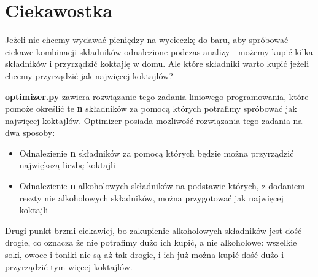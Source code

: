 \documentclass{article}
\begin{document}
\clearpage

\section{Ciekawostka}
Jeżeli nie chcemy wydawać pieniędzy na wycieczkę do baru, aby spróbować ciekawe kombinacji składników odnalezione podczas analizy - możemy kupić kilka składników i przyrządzić koktajlę w domu. Ale które składniki warto kupić jeżeli chcemy przyrządzić jak najwięcej koktajlów?

\textbf{optimizer.py} zawiera rozwiązanie tego zadania liniowego programowania, które pomoże określić te \textbf{n} składników za pomocą których potrafimy spróbować jak najwięcej koktajlów.
Optimizer posiada możliwość rozwiązania tego zadania na dwa sposoby:
\begin{itemize}
    \item Odnalezienie \textbf{n} składników za pomocą których będzie można przyrządzić największą liczbę koktajli
    \item Odnalezienie \textbf{n} alkoholowych składników na podstawie których, z dodaniem reszty nie alkoholowych składników, można przygotować jak najwięcej koktajli
\end{itemize}

Drugi punkt brzmi ciekawiej, bo zakupienie alkoholowych składników jest dość drogie, co oznacza że nie potrafimy dużo ich kupić, a nie alkoholowe: wszelkie soki, owoce i toniki nie są aż tak drogie, i ich już można kupić dość dużo i przyrządzić tym więcej koktajlów.
\end{document}
